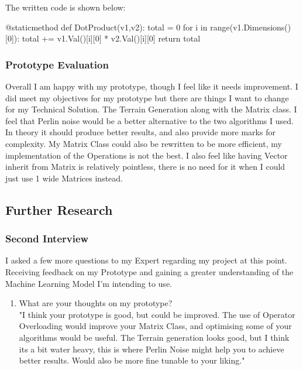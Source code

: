 \begin{flushleft}
\begin{enumerate}
                        The written code is shown below:
                        \begin{pythoncode}
@staticmethod
def DotProduct(v1,v2):
    total = 0
    for i in range(v1.Dimensions()[0]):
        total += v1.Val()[i][0] * v2.Val()[i][0]
    return total
                        \end{pythoncode}
                \end{enumerate}
            \subsubsection{Prototype Evaluation}
                \vspace{0.2cm}
                Overall I am happy with my prototype, though I feel like it needs improvement. I did meet my 
                objectives for my prototype but there are things I want to change for my Technical Solution. 
                The Terrain Generation along with the Matrix class. I feel that Perlin noise would be a better alternative
                to the two algorithms I used. In theory it should produce better results, and also provide more marks for 
                complexity. My Matrix Class could also be rewritten to be more efficient, my implementation of the Operations is not the best.
                I also feel like having Vector inherit from Matrix is relatively pointless, there is no need for it when I could just use 
                1 wide Matrices instead.
        \subsection{Further Research}
            \subsubsection{Second Interview}
                I asked a few more questions to my Expert regarding my project at this point. Receiving feedback on my Prototype and gaining a
                greater understanding of the Machine Learning Model I'm intending to use. \\
                \vspace{0.2cm}

                \begin{enumerate}
                    \item What are your thoughts on my prototype? \\ 
                        \vspace{0.2cm}
                        "I think your prototype is good, but could be improved. The use of Operator Overloading would improve your Matrix Class,
                        and optimising some of your algorithms would be useful. The Terrain generation looks good, but I think its a bit
                        water heavy, this is where Perlin Noise might help you to achieve better results. Would also be more fine tunable to
                        your liking."


\end{enumerate}
\end{flushleft}
